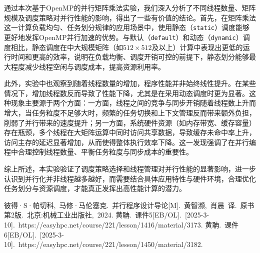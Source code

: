 \documentclass[a4paper, utf8]{ctexart}
\begin{document}
	通过本次基于OpenMP的并行矩阵乘法实验，我们深入分析了不同线程数量、矩阵规模及调度策略对并行性能的影响，得出了一些有价值的结论。首先，在矩阵乘法这一计算负载均匀、任务划分规律的应用场景中，使用静态（\verb|static|）调度能够更好地发挥OpenMP并行加速的优势。与默认（\verb|default|）和动态（\verb|dynamic|）调度相比，静态调度在中大规模矩阵（如$512\times512$及以上）计算中表现出更低的运行时间和更高的效率，说明在负载均衡、调度开销可控的前提下，静态划分能够最大程度减少线程空闲与调度成本，提高资源利用率。
	
	此外，实验中也观察到随着线程数量的增加，程序性能并非始终线性提升。在某些情况下，增加线程数反而导致了性能下降，尤其是在采用动态调度时更为显著。这种现象主要源于两个方面：一方面，线程之间的竞争与同步开销随着线程数上升而增大，当任务粒度不足够大时，频繁的任务切换和上下文管理反而带来额外负担，削弱了并行带来的速度提升；另一方面，系统硬件资源（如内存带宽、缓存容量）存在瓶颈，多个线程在大矩阵运算中同时访问共享数据，导致缓存未命中率上升，访问主存的延迟显著增加，从而使得整体执行效率下降。这一发现强调了在并行编程中合理控制线程数量、平衡任务粒度与同步成本的重要性。
	
	综上所述，本实验验证了调度策略选择和线程管理对并行性能的显著影响，进一步认识到并行化并非线程越多越好，而需要结合具体应用特性与硬件环境，合理优化任务划分与资源调度，才能真正发挥出高性能计算的潜力。
	
	\let\cleardoublepage\clearpage
	
	\begin{thebibliography}{99}  
		 彼得·S·帕切科,\ 马修·马伦塞克.\ 并行程序设计导论[M].\ 黄智濒,\ 肖晨\ 译.\ 原书第2版.\ 北京:机械工业出版社,\ 2024.
		 黄聃.\ 课件5[EB/OL].\ [2025-3-10].\ https://easyhpc.net/course/221/lesson/1416/material/3173.
		 黄聃.\ 课件6[EB/OL].\ [2025-3-10].\ https://easyhpc.net/course/221/lesson/1450/material/3182.
	\end{thebibliography}
	
\end{document}
